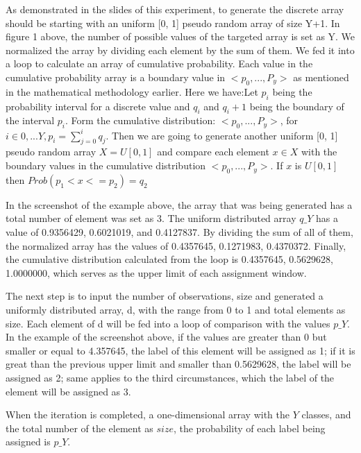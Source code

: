 \documentclass{article}
\begin{document}
\begin{multicols}{2}
        As demonstrated in the slides of this experiment, to generate the discrete array should be starting with an uniform [0, 1] pseudo random array of size Y+1. In figure 1 above, the number of possible values of the targeted array is set as Y. We normalized the array by dividing each element by the sum of them. We fed it into a loop to calculate an array of cumulative probability. Each value in the cumulative probability array is a boundary value in $<p_0,...,P_y>$ as mentioned in the mathematical methodology earlier. Here we have:Let $p_i$ being the probability interval for a discrete value and $q_i$ and $q_i+1$ being the boundary of the interval $p_i$. Form the cumulative distribution: $<p_0,...,P_y>$, for $i \in {0,...Y} , p_i =\sum_{j=0}^i q_j$. Then we are going to generate another uniform [0, 1] pseudo random array $X = U[0,1]$ and compare each element $x \in X$ with the boundary values in the cumulative distribution $<p_0,...,P_y>$. If $x$ is $U[0, 1]$ then $Prob(p_1 < x <= p_2) = q_2$

        In the screenshot of the example above, the array that was being generated has a total number of element was set as 3. The uniform distributed array $q\_Y$ has a value of 0.9356429, 0.6021019, and 0.4127837. By dividing the sum of all of them, the normalized array has the values of 0.4357645, 0.1271983, 0.4370372. Finally, the cumulative distribution calculated from the loop is 0.4357645, 0.5629628, 1.0000000, which serves as the upper limit of each assignment window.

        The next step is to input the number of observations, size and generated a uniformly distributed array, d, with the range from 0 to 1 and total elements as size.
        Each element of d will be fed into a loop of comparison with the values $p\_Y$. In the example of the screenshot above, if the values are greater than 0 but smaller or equal to 4.357645, the label of this element will be assigned as 1; if it is great than the previous upper limit and smaller than 0.5629628, the label will be assigned as 2; same applies to the third circumstances, which the label of the element will be assigned as 3.

        When the iteration is completed, a one-dimensional array with the $Y$ classes, and the total number of the element as $size$, the probability of each label being assigned is $p\_Y$.
 

\end{multicols}
\end{document}
